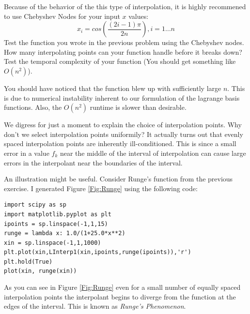 \begin{problem}
Because of the behavior of the this type of interpolation, it is highly recommened to use Chebyshev Nodes for your input $x$ values:
\[
x_i = cos\left(\frac{(2i-1)\pi}{2n}\right), i = 1\ldots n
\]
Test the function you wrote in the previous problem using the Chebyshev nodes. How many interpolating points can your function handle before it breaks down? Test the temporal complexity of your function (You should get something like $O(n^2)$).
\end{problem}

You should have noticed that the function blew up with sufficiently large $n$. This is due to numerical instability inherent to our formulation of the lagrange basis functions. Also, the $O(n^2)$ runtime is slower than desirable.

We digress for just a moment to explain the choice of interpolation points. Why don't we select interpolation points uniformily? It actually turns out that evenly spaced interpolation points are inherently ill-conditioned. This is since a small error in a value $f_k$ near the middle of the interval of interpolation can cause large errors in the interpolant near the boundaries of the interval.

An illustration might be useful. Consider Runge's function from the previous exercise. I generated Figure \ref{Fig:Runge} using the following code:

\begin{lstlisting}[style=python]
import scipy as sp
import matplotlib.pyplot as plt
ipoints = sp.linspace(-1,1,15)
runge = lambda x: 1.0/(1+25.0*x**2)
xin = sp.linspace(-1,1,1000)
plt.plot(xin,LInterp1(xin,ipoints,runge(ipoints)),'r')
plt.hold(True)
plot(xin, runge(xin))
\end{lstlisting}

As you can see in Figure \ref{Fig:Runge} even for a small number of equally spaced interpolation points the interpolant begins to diverge from the function at the edges of the interval. This is known as \emph{Runge's Phenomenon}.

